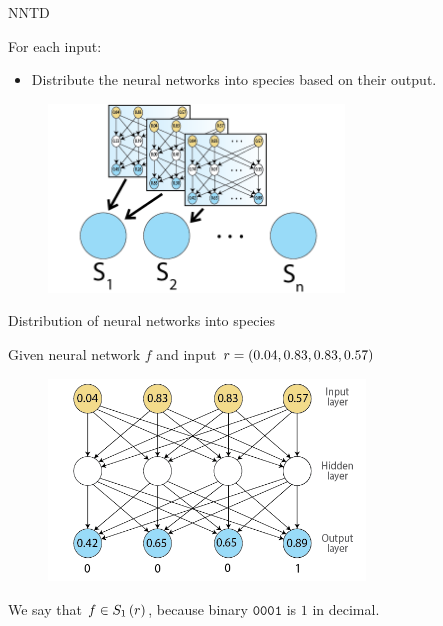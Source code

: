 \begin{frame}{NNTD}
\begin{center}
For each input:
  \begin{itemize}
	  \item Distribute the neural networks into species based on their output.
  \end{itemize}
     \begin{figure}[p]
  \includegraphics[width=0.7\textwidth]{images/speciesnn.png}
  \end{figure}
\end{center}
\end{frame}

\begin{frame}{Distribution of neural networks into species}
\begin{center}
Given neural network $f$ and input $r = (0.04, 0.83, 0.83, 0.57)$
  \begin{figure}[p]
  \includegraphics[width=0.75\textwidth]{images/nntdexample1.png}
  \end{figure}
We say that $f \in S_{1}\left(r\right)$, because binary $\texttt{0001}$ is $1$ in decimal.
\end{center}
\end{frame}

